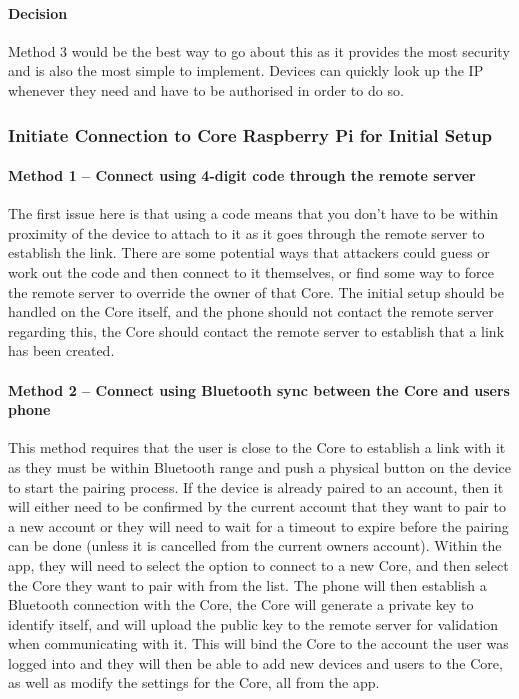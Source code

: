 \paragraph*{Decision}
Method 3 would be the best way to go about this as it provides the most security and is also the most simple to implement. Devices can quickly look up the IP whenever they need and have to be authorised in order to do so.

\subsubsection*{Initiate Connection to Core Raspberry Pi for Initial Setup}

\paragraph*{Method 1 – Connect using 4-digit code through the remote server}
The first issue here is that using a code means that you don’t have to be within proximity of the device to attach to it as it goes through the remote server to establish the link. There are some potential ways that attackers could guess or work out the code and then connect to it themselves, or find some way to force the remote server to override the owner of that Core. The initial setup should be handled on the Core itself, and the phone should not contact the remote server regarding this, the Core should contact the remote server to establish that a link has been created.

\paragraph*{Method 2 – Connect using Bluetooth sync between the Core and users phone}
This method requires that the user is close to the Core to establish a link with it as they must be within Bluetooth range and push a physical button on the device to start the pairing process. If the device is already paired to an account, then it will either need to be confirmed by the current account that they want to pair to a new account or they will need to wait for a timeout to expire before the pairing can be done (unless it is cancelled from the current owners account). Within the app, they will need to select the option to connect to a new Core, and then select the Core they want to pair with from the list. The phone will then establish a Bluetooth connection with the Core, the Core will generate a private key to identify itself, and will upload the public key to the remote server for validation when communicating with it. This will bind the Core to the account the user was logged into and they will then be able to add new devices and users to the Core, as well as modify the settings for the Core, all from the app.

